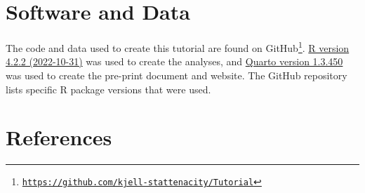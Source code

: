 \documentclass[
  letterpaper,
  DIV=11,
  numbers=noendperiod]{scrartcl}
\begin{document}
\hypertarget{software-and-data}{%
\section{Software and Data}\label{software-and-data}}

The code and data used to create this tutorial are found on
GitHub\footnote{\href{https://github.com/kjell-stattenacity/Tutorial}{\texttt{https://github.com/kjell-stattenacity/Tutorial}}}.
\href{http://cran.r-project.org}{R version 4.2.2 (2022-10-31)} was used
to create the analyses, and \href{https://quarto.org}{Quarto version
1.3.450} was used to create the pre-print document and website. The
GitHub repository lists specific R package versions that were used.

\hypertarget{references}{%
\section*{References}\label{references}}
\end{document}
